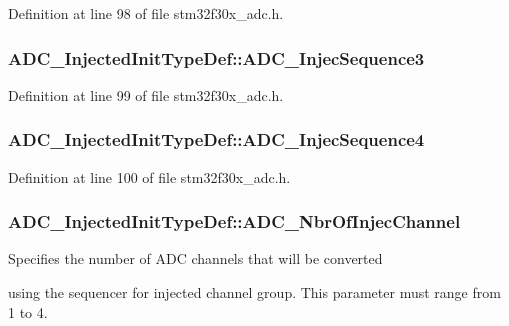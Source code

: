 Definition at line 98 of file stm32f30x\-\_\-adc.\-h.

\hypertarget{struct_a_d_c___injected_init_type_def_ac03eb12e488ddd801e286244acc00327}{
\subsubsection[{A\-D\-C\-\_\-\-Injec\-Sequence3}]{ A\-D\-C\-\_\-\-Injected\-Init\-Type\-Def\-::\-A\-D\-C\-\_\-\-Injec\-Sequence3}}\label{struct_a_d_c___injected_init_type_def_ac03eb12e488ddd801e286244acc00327}


Definition at line 99 of file stm32f30x\-\_\-adc.\-h.

\hypertarget{struct_a_d_c___injected_init_type_def_a2fe8874017f36b24f86b03cd65e6faee}{
\subsubsection[{A\-D\-C\-\_\-\-Injec\-Sequence4}]{ A\-D\-C\-\_\-\-Injected\-Init\-Type\-Def\-::\-A\-D\-C\-\_\-\-Injec\-Sequence4}}\label{struct_a_d_c___injected_init_type_def_a2fe8874017f36b24f86b03cd65e6faee}


Definition at line 100 of file stm32f30x\-\_\-adc.\-h.

\hypertarget{struct_a_d_c___injected_init_type_def_a7850351cbc6c622318bdb7d34b4ee5c8}{
\subsubsection[{A\-D\-C\-\_\-\-Nbr\-Of\-Injec\-Channel}]{ A\-D\-C\-\_\-\-Injected\-Init\-Type\-Def\-::\-A\-D\-C\-\_\-\-Nbr\-Of\-Injec\-Channel}}\label{struct_a_d_c___injected_init_type_def_a7850351cbc6c622318bdb7d34b4ee5c8}
\begin{DoxyVerb}               Specifies the number of ADC channels that will be converted
\end{DoxyVerb}
 using the sequencer for injected channel group. This parameter must range from 1 to 4. 

